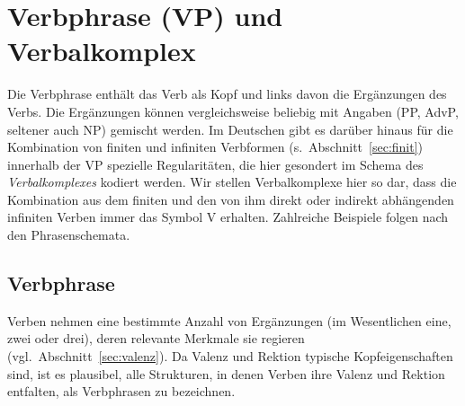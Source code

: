 \section{Verbphrase (VP) und Verbalkomplex}

\label{sec:vgr}

Die Verbphrase enthält das Verb als Kopf und links davon die Ergänzungen des Verbs.
Die Ergänzungen können vergleichsweise beliebig mit Angaben (PP, AdvP, seltener auch NP) gemischt werden.
Im Deutschen gibt es darüber hinaus für die Kombination von finiten und infiniten Verbformen (s.\ Abschnitt~\ref{sec:finit}) innerhalb der VP spezielle Regularitäten, die hier gesondert im Schema des \textit{Verbalkomplexes} kodiert werden.
Wir stellen Verbalkomplexe hier so dar, dass die Kombination aus dem finiten und den von ihm direkt oder indirekt abhängenden infiniten Verben immer das Symbol V erhalten.
Zahlreiche Beispiele folgen nach den Phrasenschemata.





\subsection{Verbphrase}

\label{sec:verbphrase}


Verben nehmen eine bestimmte Anzahl von Ergänzungen (im Wesentlichen eine, zwei oder drei), deren relevante Merkmale sie regieren (vgl.\ Abschnitt~\ref{sec:valenz}).
Da Valenz und Rektion typische Kopfeigenschaften sind, ist es plausibel, alle Strukturen, in denen Verben ihre Valenz und Rektion entfalten, als Verbphrasen zu bezeichnen.

\begin{exe}
\end{exe}

